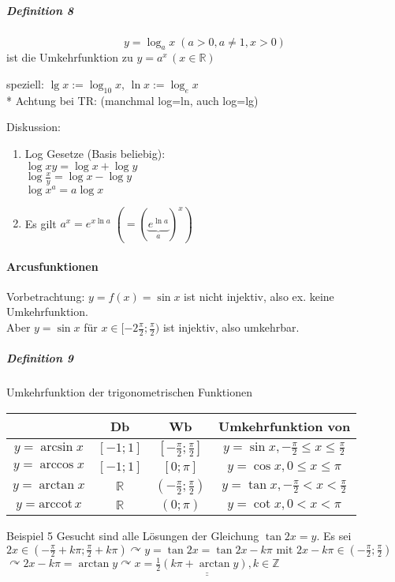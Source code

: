\documentclass[a4paper]{scrartcl}
\begin{document}
\subparagraph{Definition 8}
\[y=\log_a{x} \; (a>0, a\neq 1, x>0)\] ist die Umkehrfunktion zu $y=a^x \, (x\in \mathbb{R})$

speziell: $\lg{x}:= \log_{10}{x},\, \ln{x} := \log_e{x}$\\*
Achtung bei TR: (manchmal log=ln, auch log=lg)

Diskussion:
\begin{enumerate}
\item Log Gesetze (Basis beliebig):\\
$\log{xy} = \log{x} + \log{y}$\\
$\log{\frac{x}{y}}= \log{x} - \log{y}$\\
$\log{x^a} = a\log{x}$
\item Es gilt $a^x = e^{x \ln{a}} \; (= (\underbrace{e^{\ln{a}}}_{a})^x)$
\end{enumerate}

\paragraph{Arcusfunktionen}
Vorbetrachtung: $y=f(x) = \sin{x}$ ist nicht injektiv, also ex. keine Umkehrfunktion.\\
Aber $y=\sin{x}$ für $x\in [-2\frac{\pi}{2};\frac{\pi}{2} )$ ist injektiv, also umkehrbar.

\subparagraph{Definition 9} Umkehrfunktion der trigonometrischen Funktionen\\
\begin{tabular}{c|c|c||c}
 & Db & Wb & Umkehrfunktion von\\ \hline
$y=\arcsin{x}$ & $[-1;1]$ & $[-\frac{\pi}{2};\frac{\pi}{2}]$ & $y=\sin{x}, -\frac{\pi}{2} \leq x \leq \frac{\pi}{2}$\\ 
$y= \arccos{x}$ & $[-1;1]$ & $[0;\pi]$ & $y=\cos{x} , 0 \leq x \leq \pi$\\
$y = \arctan{x}$ & $\mathbb{R}$ & $(-\frac{\pi}{2} ; \frac{\pi}{2} )$ & $y= \tan{x}, -\frac{\pi}{2} < x < \frac{\pi}{2}$ \\
$y= \text{arccot} \,x$ & $\mathbb{R}$ & $(0;\pi)$ & $y=\cot{x}, 0<x<\pi$\\
\end{tabular}

Beispiel 5 Gesucht sind alle Lösungen der Gleichung $\tan{2x} = y$. Es sei $2x \in (-\frac{\pi}{2} + k \pi ; \frac{\pi}{2} + k\pi) \curvearrowright y=\tan{2x}=\tan{2x-k\pi} \text{ mit } 2x - k\pi \in (-\frac{\pi}{2} ; \frac{\pi}{2} )$\\
$\curvearrowright 2x - k\pi = \arctan{y} \curvearrowright \underline{\underline{ x = \frac{1}{2} (k\pi + \arctan{y}), k \in \mathbb{Z} }}$
\end{document}
